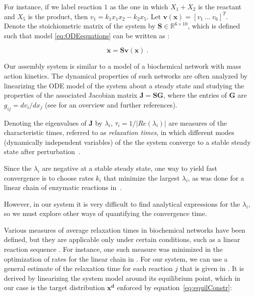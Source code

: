         For instance, if we label reaction $1$ as the one in which $X_1 + X_2$ is the
        reactant and $X_5$ is the product, then $v_1 = k_1 x_1 x_2 - k_2
        x_5$.  Let $\mathbf{v(x)} = [v_1~...~v_{6}]^T$.  Denote the
        stoichiometric matrix of the system by $\mathbf{S} \in
        \mathbb{R}^{6 \times 10}$, which is defined such that model
        \eqref{eq:ODEequations} can be written as \cite{bib:Heinrich1996}:

        \begin{equation}
            \mathbf{\dot{x}} = \mathbf{S} \mathbf{v(x)}~.
        \end{equation}


        Our assembly system is similar to a model of a biochemical network
        with mass action kinetics.  The dynamical properties of such
        networks are often analyzed by linearizing the ODE model of the
        system about a steady state and studying the properties of the
        associated Jacobian matrix $\mathbf{J} = \mathbf{S} \mathbf{G}$,
        where the entries of $\mathbf{G}$ are $g_{ij} = dv_i/dx_j$ (see
        \cite{bib:Jamshidi2008} for an overview and further references).

        Denoting the eigenvalues of $\mathbf{J}$ by $\lambda_i$, $\tau_i =
        1/|Re(\lambda_i)|$ are measures of the characteristic times,
        referred to as {\it relaxation times}, in which different modes
        (dynamically independent variables) of the the system converge to a
        stable steady state after perturbation~\cite{bib:Heinrich1977, bib:Jamshidi2008}.

        Since the $\lambda_i$ are negative at a stable steady state, one way to yield fast convergence is to choose
        rates $k_i$ that minimize the largest $\lambda_i$, as was done for a
        linear chain of enzymatic reactions in~\cite{Schuster:1987p11838}.

        However, in our system it is very difficult to find analytical
        expressions for the $\lambda_i$, so we must explore other ways of
        quantifying the convergence time.

        Various measures of average relaxation times in biochemical networks
        have been defined, but they are applicable only under certain
        conditions, such as a linear reaction sequence
        \cite{bib:Heinrich1991}.  For instance, one such measure was
        minimized in the optimization of rates for the linear chain in
        \cite{Schuster:1987p11838}.  For our system, we can use a general
        estimate of the relaxation time for each reaction $j$ that is given
        in \cite{bib:Heinrich1996}.  It is derived by linearizing the system
        model around its equilibrium point, which in our case is the target
        distribution $\mathbf{x^d}$ enforced by equation~\eqref{eq:equilConstr}:

